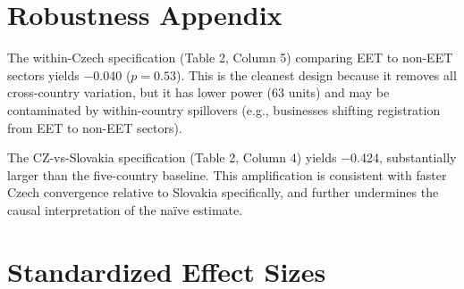 \documentclass[12pt]{article}
\begin{document}
\section{Robustness Appendix}

The within-Czech specification (Table 2, Column 5) comparing EET to non-EET sectors yields $-$0.040 ($p = 0.53$). This is the cleanest design because it removes all cross-country variation, but it has lower power (63 units) and may be contaminated by within-country spillovers (e.g., businesses shifting registration from EET to non-EET sectors).

The CZ-vs-Slovakia specification (Table 2, Column 4) yields $-$0.424, substantially larger than the five-country baseline. This amplification is consistent with faster Czech convergence relative to Slovakia specifically, and further undermines the causal interpretation of the na\"{i}ve estimate.

\section{Standardized Effect Sizes}
\label{sec:sde}


\end{document}

